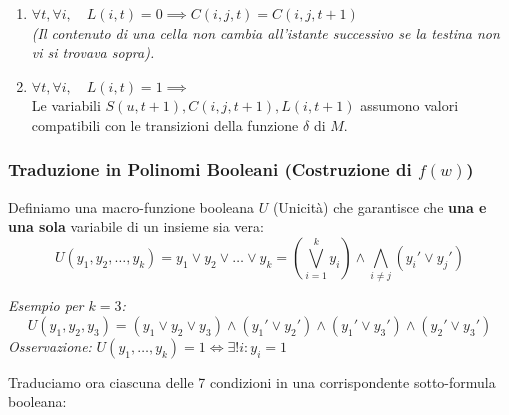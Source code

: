 \begin{enumerate}
    \item $\forall t, \forall i, \quad L(i, t) = 0 \implies C(i, j, t) = C(i, j, t+1)$ \\
    \textit{(Il contenuto di una cella non cambia all'istante successivo se la testina non vi si trovava sopra).}
    
    \item $\forall t, \forall i, \quad L(i, t) = 1 \implies$ \\
    Le variabili $S(u, t+1), C(i, j, t+1), L(i, t+1)$ assumono valori compatibili con le transizioni della funzione $\delta$ di $M$.
\end{enumerate}


\vspace{0.8cm}

\subsubsection*{Traduzione in Polinomi Booleani (Costruzione di $f(w)$)}

Definiamo una macro-funzione booleana $U$ (Unicità) che garantisce che \textbf{una e una sola} variabile di un insieme sia vera:
$$ U(y_1, y_2, \dots, y_k) = y_1 \lor y_2 \lor \dots \lor y_k = \left( \bigvee_{i=1}^k y_i \right) \land \bigwedge_{i \neq j} (y_i' \lor y_j') $$

\textit{Esempio per $k=3$:}
$$ U(y_1, y_2, y_3) = (y_1 \lor y_2 \lor y_3) \land (y_1' \lor y_2') \land (y_1' \lor y_3') \land (y_2' \lor y_3') $$
\textit{Osservazione:} $U(y_1, \dots, y_k) = 1 \iff \exists! i : y_i = 1$

\vspace{0.6cm}
Traduciamo ora ciascuna delle 7 condizioni in una corrispondente sotto-formula booleana:


